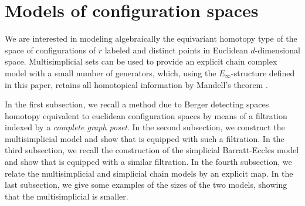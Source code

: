 
\section{Models of configuration spaces}

We are interested in modeling algebraically the equivariant homotopy type of the space of configurations of $r$ labeled and distinct points in Euclidean $d$-dimensional space.
Multisimplicial sets can be used to provide an explicit chain complex model with a small number of generators, which, using the $E_\infty$-structure defined in this paper, retains all homotopical information by Mandell's theorem \cite{mandell2006homotopy_type}.

In the first subsection, we recall a method due to Berger detecting spaces homotopy equivalent to euclidean configuration spaces by means of a filtration indexed by a {\em complete graph poset}.
In the second subsection, we construct the multisimplicial model and show that is equipped with such a filtration.
In the third subsection, we recall the construction of the simplicial Barratt-Eccles model and show that is equipped with a similar filtration.
In the fourth subsection, we relate the multisimplicial and simplicial chain models by an explicit map. In the last subsection, we give some examples of the sizes of the two models, showing that the multisimplicial is smaller.







